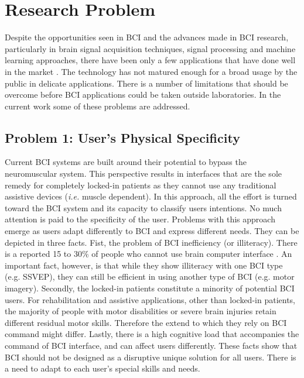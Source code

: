 \section{Research Problem}
\label{sec:research_problem}

Despite the opportunities seen in BCI and the advances made in BCI research, particularly in brain signal acquisition techniques, signal processing and machine learning approaches, there have been only a few applications that have done well in the market \citep{mensia_mensia_2016,melomind_melomind_2016,gtec_intendix_2017}. 
The technology has not matured enough for a broad usage by the public in delicate applications.
There is a number of limitations that should be overcome before BCI applications could be taken outside laboratories. 
In the current work some of these problems are addressed. 

\subsection*{Problem 1: User's Physical Specificity}


Current BCI systems are built around their potential to bypass the neuromuscular system.
This perspective results in interfaces that are the sole remedy for completely locked-in patients as they cannot use any traditional assistive devices (\textit{i.e.} muscle dependent).
In this approach, all the effort is turned toward the BCI system and its capacity to classify users intentions. 
No much attention is paid to the specificity of the user.
Problems with this approach emerge as users adapt differently to BCI and express different needs. 
They can be depicted in three facts.
Fist, the problem of BCI inefficiency (or illiteracy). There is a reported 15 to 30\% of people who cannot use brain computer interface \citep{allison_could_2010}. 
An important fact, however, is that while they show illiteracy with one BCI type (e.g. SSVEP), they can still be efficient in using another type of BCI (e.g. motor imagery).
Secondly, the locked-in patients constitute a minority of potential BCI users. 
For rehabilitation and assistive applications, other than locked-in patients, the majority of people with motor disabilities or severe brain injuries retain different residual motor skills.
Therefore the extend to which they rely on BCI command might differ. 
Lastly, there is a high cognitive load that accompanies the command of BCI interface, and can affect users differently.
These facts show that BCI should not be designed as a disruptive unique solution for all users. 
There is a need to adapt to each user's special skills and needs.    						 

